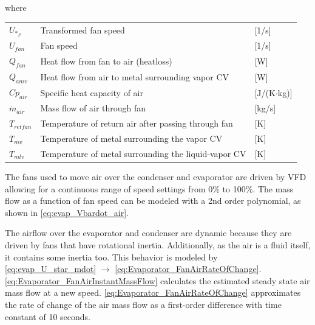 where

\begin{center}
	\begin{tabular}{l p{10cm} l}
		$U_{*_P}$       & Transformed fan speed                                & [1/\si{s}]                        \\
		$U_{fan}$       & Fan speed                                            & [1/\si{s}]                        \\
		$Q_{fan}$       & Heat flow from fan to air (heatloss)                 & [\si{W}]                          \\
		$Q_{amv}$       & Heat flow from air to metal surrounding vapor CV     & [\si{W}]                          \\
		$Cp_{air}$      & Specific heat capacity of air                        & [\si{J}/(\si{K}$ \cdot $\si{kg})] \\
		$\dot{m}_{air}$ & Mass flow of air through fan                         & [\si{kg}/\si{s}]                  \\
		$T_{retfan}$    & Temperature of return air after passing through fan  & [\si{K}]                          \\
		$T_{mv}$        & Temperature of metal surrounding the vapor CV        & [\si{K}]                          \\
		$T_{mlv}$       & Temperature of metal surrounding the liquid-vapor CV & [\si{K}]
	\end{tabular}
\end{center}

The fans used to move air over the condenser and evaporator are driven by VFD allowing for a continuous range of speed settings from 0\% to 100\%. The mass flow as a function of fan speed can be modeled with a 2nd order polynomial, as shown in \cref{eq:evap_Vbardot_air}.

The airflow over the evaporator and condenser are dynamic because they are driven by fans that have rotational inertia. Additionally, as the air is a fluid itself, it contains some inertia too. This behavior is modeled by \cref{eq:evap_U_star_mdot} $\rightarrow$ \cref{eq:Evaporator_FanAirRateOfChange}. \cref{eq:Evaporator_FanAirInstantMassFlow} calculates the estimated steady state air mass flow at a new speed. \cref{eq:Evaporator_FanAirRateOfChange} approximates the rate of change of the air mass flow as a first-order difference with time constant of 10 seconds.

